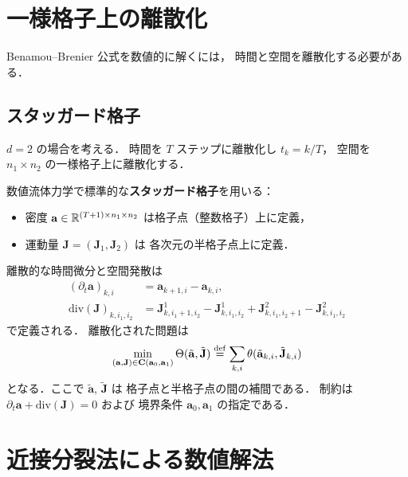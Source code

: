 \section{一様格子上の離散化}\label{sec:discretization}

Benamou--Brenier 公式を数値的に解くには，
時間と空間を離散化する必要がある．

\subsection{スタッガード格子}\label{subsec:staggered}

$d = 2$ の場合を考える．
時間を $T$ ステップに離散化し $t_k = k/T$，
空間を $n_1 \times n_2$ の一様格子上に離散化する．

数値流体力学で標準的な\textbf{スタッガード格子}を用いる：
\begin{itemize}
  \item 密度 $\mathbf{a} \in \mathbb{R}^{(T+1) \times n_1 \times n_2}$
    は格子点（整数格子）上に定義，
  \item 運動量 $\mathbf{J} = (\mathbf{J}_1, \mathbf{J}_2)$ は
    各次元の半格子点上に定義．
\end{itemize}

離散的な時間微分と空間発散は
\begin{align*}
  (\partial_t \mathbf{a})_{k,i} &= \mathbf{a}_{k+1,i} - \mathbf{a}_{k,i}, \\
  \mathrm{div}(\mathbf{J})_{k,i_1,i_2}
  &= \mathbf{J}^1_{k,i_1+1,i_2} - \mathbf{J}^1_{k,i_1,i_2}
  + \mathbf{J}^2_{k,i_1,i_2+1} - \mathbf{J}^2_{k,i_1,i_2}
\end{align*}
で定義される．
離散化された問題は
\begin{equation}\label{eq:bb-discrete}
  \min_{(\mathbf{a}, \mathbf{J}) \in \mathbf{C}(\mathbf{a}_0, \mathbf{a}_1)}
  \Theta(\tilde{\mathbf{a}}, \tilde{\mathbf{J}})
  \overset{\mathrm{def}}{=} \sum_{k,i} \theta(\tilde{\mathbf{a}}_{k,i}, \tilde{\mathbf{J}}_{k,i})
\end{equation}
となる．ここで $\tilde{\mathbf{a}}$, $\tilde{\mathbf{J}}$ は
格子点と半格子点の間の補間である．
制約は $\partial_t \mathbf{a} + \mathrm{div}(\mathbf{J}) = 0$ および
境界条件 $\mathbf{a}_0, \mathbf{a}_1$ の指定である．


\section{近接分裂法による数値解法}\label{sec:proximal-solver}

